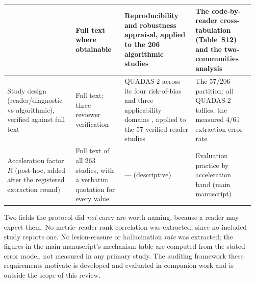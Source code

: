 \documentclass[11pt]{article}
\begin{document}
\begin{table}[t]
\begin{tabular}{p{} p{} p{} p{}}
& Full text where obtainable
& Reproducibility and robustness appraisal, applied to the 206 algorithmic studies
& The code-by-reader cross-tabulation (Table~S12) and the two-communities analysis \\
\hline
Study design (reader/diagnostic vs algorithmic), verified against full text
& Full text; three-reviewer verification
& QUADAS-2 across its four risk-of-bias and three applicability domains
\cite{whiting2011quadas}, applied to the 57 verified reader studies
& The 57/206 partition; all QUADAS-2 tallies; the measured $4/61$ extraction error rate \\
\hline
Acceleration factor $R$ (post-hoc, added after the registered extraction round)
& Full text of all 263 studies, with a verbatim quotation for every value
& --- (descriptive)
& Evaluation practice by acceleration band (main manuscript) \\
\hline
\end{tabular}

\vspace{2pt}
{\footnotesize Two fields the protocol did \emph{not} carry are worth naming, because a
reader may expect them. No metric--reader rank correlation was extracted, since no included
study reports one. No lesion-erasure or hallucination \emph{rate} was extracted; the figures
in the main manuscript's mechanism table are computed from the stated error model, not
measured in any primary study. The auditing framework these requirements motivate is
developed and evaluated in companion work and is outside the scope of this review.}
\end{table}
\end{document}
